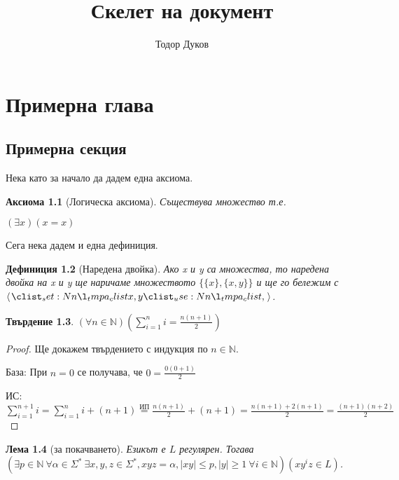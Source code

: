 \documentclass[11pt, a5paper]{report}
\title{Скелет на документ}
\author{Тодор Дуков}
\date{}
\newtheorem{definition}{Дефиниция}[section]
\newtheorem{claim}[definition]{Твърдение}
\newtheorem{axiom}[definition]{Аксиома}
\newtheorem{lemma}[definition]{Лема}
\theoremstyle{remark}
\begin{document}
\maketitle
\tableofcontents
\chapter{Примерна глава}
\section{Примерна секция}

Нека като за начало да дадем една аксиома.

\begin{axiom}[Логическа аксиома]
    Съществува множество т.е.

    \centerline{$( \exists x ) ( x = x)$}
\end{axiom}

Сега нека дадем и една дефиниция.

\begin{definition}[Наредена двойка]
    Ако x и y са множества, то наредена двойка на x и y ще наричаме множеството $\{\{x\}, \{x, y\}\}$ и ще го бележим с $\opair{x, y}$.
\end{definition}

\begin{claim}
    $( \forall n \in \mathbb{N} ) ( \displaystyle\sum_{i=1}^{n}i = \frac{n(n+1)}{2} )$
\end{claim}

\begin{proof}
    Ще докажем твърдението с индукция по $n \in \mathbb{N}$.

    База: При $n = 0$ се получава, че $0 = \frac{0(0+1)}{2}$ \checkmark

    ИС: $\displaystyle\sum_{i=1}^{n+1}i = \displaystyle\sum_{i=1}^{n}i + (n + 1) \overset{\text{ИП}}{=} \frac{n(n+1)}{2} + (n + 1) = \frac{n(n+1) + 2(n+1)}{2} = \frac{(n+1)(n+2)}{2}$
\end{proof}

\begin{lemma}[за покачването]
    Езикът е $L$ регулярен.
    Тогава $(\exists p \in \mathbb{N} \: \forall \alpha \in \Sigma^* \: \exists x, y, z \in \Sigma^*, xyz = \alpha, |xy| \leq p, |y| \geq 1 \: \forall i \in \mathbb{N}) (xy^iz \in L)$.
\end{lemma}
\end{document}
